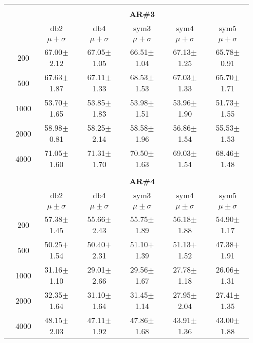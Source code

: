 \begin{table}[H]
\begin{tabular}{|c|c|c c c c c|}
\\ \midrule
\multicolumn{7}{c}{}\\ 



\cline{3-7}
\multicolumn{2}{c|}{\multirow{3}{*}{}} & \multicolumn{5}{c|}{\textbf{AR\#3}}   \\\cline{3-7} 

\multicolumn{2}{c|}{}  & db2 & db4 & sym3 & sym4 & sym5 \\\cline{3-7}
\multicolumn{2}{c|}{}& $\mu \pm \sigma$ & $\mu \pm \sigma$ & $\mu \pm \sigma$ & $\mu \pm \sigma$ & $\mu \pm \sigma$ \\\hline

\multicolumn{1}{|c|}{ \multirow{5}{*}{\rotatebox[origin=c]{90}{\textbf{Neurônios}}} }
&200	&67.00$\pm$2.12	&67.05$\pm$1.05	&66.51$\pm$1.04	&67.13$\pm$1.25	&65.78$\pm$0.91	\\\cline{2-7}
&500	&67.63$\pm$1.87	&67.11$\pm$1.33	&68.53$\pm$1.53	&67.03$\pm$1.33	&65.70$\pm$1.71	\\\cline{2-7}
&1000	&53.70$\pm$1.65	&53.85$\pm$1.83	&53.98$\pm$1.51	&53.96$\pm$1.90	&51.73$\pm$1.55	\\\cline{2-7}
&2000	&58.98$\pm$0.81	&58.25$\pm$2.14	&58.58$\pm$1.96	&56.86$\pm$1.54	&55.53$\pm$1.53	\\\cline{2-7}
&4000	&71.05$\pm$1.60	&71.31$\pm$1.70	&70.50$\pm$1.63	&69.03$\pm$1.54	&68.46$\pm$1.48	

\\\midrule 
\multicolumn{7}{c}{}\\ 



\cline{3-7}
\multicolumn{2}{c|}{\multirow{3}{*}{}} & \multicolumn{5}{c|}{\textbf{AR\#4}}   \\\cline{3-7} 

\multicolumn{2}{c|}{}  & db2 & db4 & sym3 & sym4 & sym5 \\\cline{3-7}
\multicolumn{2}{c|}{}& $\mu \pm \sigma$ & $\mu \pm \sigma$ & $\mu \pm \sigma$ & $\mu \pm \sigma$ & $\mu \pm \sigma$ \\\hline

\multicolumn{1}{|c|}{ \multirow{5}{*}{\rotatebox[origin=c]{90}{\textbf{Neurônios}}} }
&200	&57.38$\pm$1.45	&55.66$\pm$2.43	&55.75$\pm$1.89	&56.18$\pm$1.88	&54.90$\pm$1.17	\\\cline{2-7}
&500	&50.25$\pm$1.54	&50.40$\pm$2.31	&51.10$\pm$1.39	&51.13$\pm$1.52	&47.38$\pm$1.91	\\\cline{2-7}
&1000	&31.16$\pm$1.10	&29.01$\pm$2.66	&29.56$\pm$1.67	&27.78$\pm$1.18	&26.06$\pm$1.31	\\\cline{2-7}
&2000	&32.35$\pm$1.64	&31.10$\pm$1.64	&31.45$\pm$1.14	&27.95$\pm$2.04	&27.41$\pm$1.35	\\\cline{2-7}
&4000	&48.15$\pm$2.03	&47.11$\pm$1.92	&47.86$\pm$1.68	&43.91$\pm$1.36	&43.00$\pm$1.88	

\\\midrule
	\end{tabular}

\end{table}

